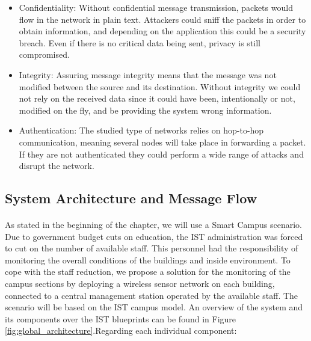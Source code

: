 \begin{itemize}
	\item Confidentiality: Without confidential message transmission, packets would flow in the network in plain text. Attackers could sniff the packets in order to obtain information, and depending on the application this could be a security breach. Even if there is no critical data being sent, privacy is still compromised.\\
	\item Integrity: Assuring message integrity means that the message was not modified between the source and its destination. Without integrity we could not rely on the received data since it could have been, intentionally or not, modified on the fly, and be providing the system wrong information.\\
	\item Authentication: The studied type of networks relies on hop-to-hop communication, meaning several nodes will take place in forwarding a packet. If they are not authenticated they could perform a wide range of attacks and disrupt the network.
\end{itemize}

\subsection{System Architecture and Message Flow}
\paragraph{}

As stated in the beginning of the chapter, we will use a Smart Campus scenario. Due to government budget cuts on education, the \ac{IST} administration was forced to cut on the number of available staff. This personnel had the responsibility of monitoring the overall conditions of the buildings and inside environment. To cope with the staff reduction, we propose a solution for the monitoring of the campus sections by deploying a wireless sensor network on each building, connected to a central management station operated by the available staff. The scenario will be based on the \ac{IST} campus model. An overview of the system and its components over the \ac{IST} blueprints can be found in Figure \ref{fig:global_architecture}.Regarding each individual component:

